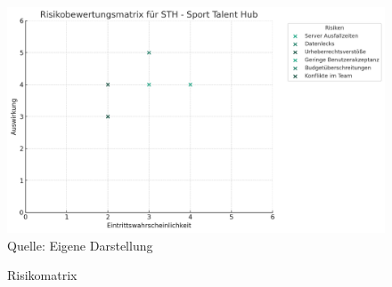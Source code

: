\begin{figure}[H]
	\caption[Risikomatrix]{Risikomatrix}
	\includegraphics[width=1.0\textwidth]{assets/figures/risikomatrix.png}
    \\
	Quelle: Eigene Darstellung
\end{figure}

